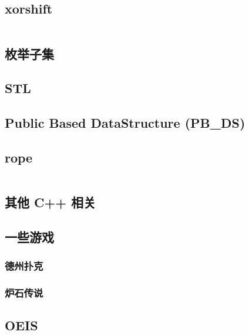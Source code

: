 \documentclass[a4paper, twoside]{article}
\begin{document}
\begin{multicols}{2}
			\subsection{xorshift}
				\inputminted{cpp}{../src/misc/xorshift.cpp}
			
			\subsection{枚举子集}
				
				
			\subsection{STL}
				

			\subsection{Public Based DataStructure (PB\_DS)}
				\label{pbds}
				

			\subsection{rope}
				\inputminted{cpp}{../src/misc/rope.cpp}
			
			\subsection{其他 C++ 相关}
				
			
			\subsection{一些游戏}
				\subsubsection{德州扑克}
					

				\subsubsection{炉石传说}
					

			\subsection{OEIS}
				\label{oeis}
				
			

\end{multicols}
\end{document}
